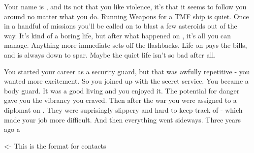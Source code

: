 \documentclass[char]{TMFHope}
\begin{document}
\name{\cWeap{}}

Your name is \cWeap{}, and its not that you like violence, it's that it seems to follow you around no matter what you do. Running Weapons for a TMF ship is quiet. Once in a handful of missions you'll be called on to blast a few asteroids out of the way. It's kind of a boring life, but after what happened on \pHome{}, it's all you can manage. Anything more immediate sets off the flashbacks. Life on \pNew{} pays the bills, and \cSci{} is always down to spar. Maybe the quiet life isn't so bad after all.

You started your career as a security guard, but that was awfully repetitive - you wanted more excitement. So you joined up with the \pPlan{} secret service. You became a body guard. It was a good living and you enjoyed it. The potential for danger gave you the vibrancy you craved. Then after the war you were assigned to a diplomat on \pHome{}. They were suprisingly slippery and hard to keep track of - which made your job more difficult. And then everything went sideways. Three years ago a 

\begin{itemz}[Goals]
	\item 
\end{itemz}

\begin{itemz}[Notes]
	\item 
\end{itemz}

\begin{contacts}
	\contact{\cTest{}} <- This is the format for contacts 
\end{contacts}
\end{document}
